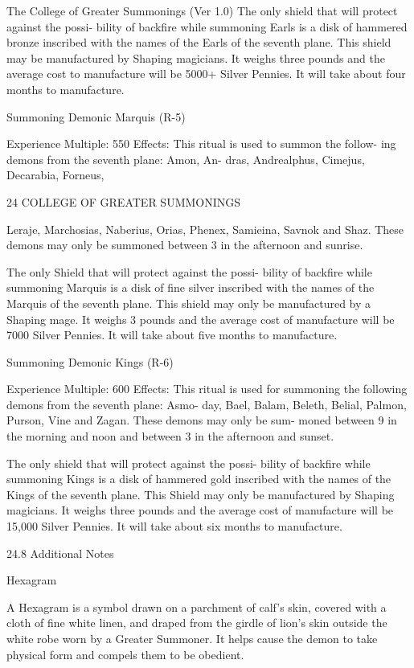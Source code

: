 \begin{Chapter}{The College of Greater Summonings (Ver 1.0)}
The only shield that will protect against the possi-
bility of backfire  while summoning Earls is a disk 
of  hammered  bronze  inscribed  with  the  names  of 
the Earls of the seventh plane. This shield may be 
manufactured  by  Shaping  magicians.  It  weighs 
three  pounds  and  the  average  cost  to  manufacture 
will  be  5000+  Silver  Pennies.  It  will  take  about 
four months to manufacture. 

Summoning Demonic Marquis (R-5) 

Experience Multiple: 550 
Effects:  This  ritual  is  used  to  summon  the  follow-
ing  demons  from  the  seventh  plane:  Amon,  An-
dras,  Andrealphus,  Cimejus,  Decarabia,  Forneus, 

24 COLLEGE OF GREATER SUMMONINGS 

Leraje,  Marchosias,  Naberius,  Orias,  Phenex, 
Samieina,  Savnok  and  Shaz.  These  demons  may 
only be summoned between 3 in the afternoon and 
sunrise. 

The only Shield that will protect against the possi-
bility  of  backfire  while  summoning  Marquis  is  a 
disk  of  fine  silver  inscribed  with the  names  of  the 
Marquis of the seventh plane. This shield may only 
be  manufactured  by  a  Shaping  mage.  It  weighs  3 
pounds and the average cost of manufacture will be 
7000 Silver Pennies. It will take about five months 
to manufacture. 

Summoning Demonic Kings (R-6) 

Experience Multiple: 600 
Effects:  This  ritual  is  used  for  summoning  the 
following  demons  from  the  seventh  plane:  Asmo-
day,  Bael,  Balam,  Beleth,  Belial,  Palmon,  Purson, 
Vine and Zagan. These demons may only be sum-
moned  between  9  in  the  morning  and  noon  and 
between 3 in the afternoon and sunset. 

The only shield that will protect against the possi-
bility of backfire while summoning Kings is a disk 
of hammered gold inscribed with the names of the 
Kings  of  the  seventh  plane.  This  Shield  may  only 
be  manufactured  by  Shaping  magicians.  It  weighs 
three  pounds  and  the  average  cost  of  manufacture 
will be 15,000 Silver Pennies. It will take about six 
months to manufacture. 

24.8 Additional Notes 

Hexagram 

A Hexagram is a symbol drawn on a parchment of 
calf’s skin, covered with a cloth of fine white linen, 
and  draped  from  the  girdle  of  lion’s  skin  outside 
the  white  robe  worn  by  a  Greater  Summoner.  It 
helps  cause  the  demon  to  take  physical  form  and 
compels them to be obedient. 


\end{Chapter}
